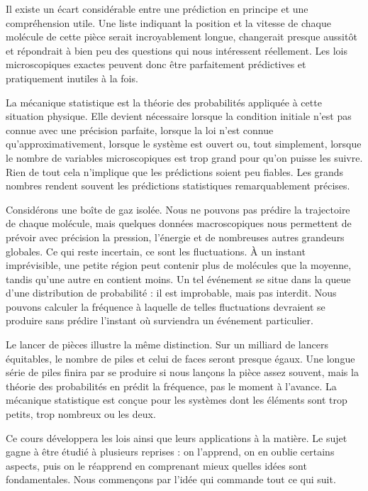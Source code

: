 Il existe un écart considérable entre une prédiction en principe et une compréhension utile. Une liste indiquant la position et la vitesse de chaque molécule de cette pièce serait incroyablement longue, changerait presque aussitôt et répondrait à bien peu des questions qui nous intéressent réellement. Les lois microscopiques exactes peuvent donc être parfaitement prédictives et pratiquement inutiles à la fois.

La mécanique statistique est la théorie des probabilités appliquée à cette situation physique. Elle devient nécessaire lorsque la condition initiale n’est pas connue avec une précision parfaite, lorsque la loi n’est connue qu’approximativement, lorsque le système est ouvert ou, tout simplement, lorsque le nombre de variables microscopiques est trop grand pour qu’on puisse les suivre. Rien de tout cela n’implique que les prédictions soient peu fiables. Les grands nombres rendent souvent les prédictions statistiques remarquablement précises.

Considérons une boîte de gaz isolée. Nous ne pouvons pas prédire la trajectoire de chaque molécule, mais quelques données macroscopiques nous permettent de prévoir avec précision la pression, l’énergie et de nombreuses autres grandeurs globales. Ce qui reste incertain, ce sont les fluctuations. À un instant imprévisible, une petite région peut contenir plus de molécules que la moyenne, tandis qu’une autre en contient moins. Un tel événement se situe dans la queue d’une distribution de probabilité : il est improbable, mais pas interdit. Nous pouvons calculer la fréquence à laquelle de telles fluctuations devraient se produire sans prédire l’instant où surviendra un événement particulier.

Le lancer de pièces illustre la même distinction. Sur un milliard de lancers équitables, le nombre de piles et celui de faces seront presque égaux. Une longue série de piles finira par se produire si nous lançons la pièce assez souvent, mais la théorie des probabilités en prédit la fréquence, pas le moment à l’avance. La mécanique statistique est conçue pour les systèmes dont les éléments sont trop petits, trop nombreux ou les deux.

Ce cours développera les lois ainsi que leurs applications à la matière. Le sujet gagne à être étudié à plusieurs reprises : on l’apprend, on en oublie certains aspects, puis on le réapprend en comprenant mieux quelles idées sont fondamentales. Nous commençons par l’idée qui commande tout ce qui suit.

